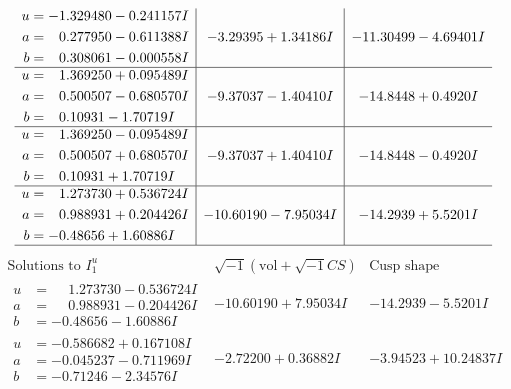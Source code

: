 \documentclass[1p]{elsarticle_modified}
\theoremstyle{definition}
\newcommand{\I}{\sqrt{-1}}
\begin{document}
$$\begin{array}{c|c|c}
\begin{aligned}
u &= -1.329480 - 0.241157 I \\
a &= \phantom{-}0.277950 - 0.611388 I \\
b &= \phantom{-}0.308061 - 0.000558 I\end{aligned}
 & -3.29395 + 1.34186 I & -11.30499 - 4.69401 I \\ \hline\begin{aligned}
u &= \phantom{-}1.369250 + 0.095489 I \\
a &= \phantom{-}0.500507 - 0.680570 I \\
b &= \phantom{-}0.10931 - 1.70719 I\end{aligned}
 & -9.37037 - 1.40410 I & -14.8448 + 0.4920 I \\ \hline\begin{aligned}
u &= \phantom{-}1.369250 - 0.095489 I \\
a &= \phantom{-}0.500507 + 0.680570 I \\
b &= \phantom{-}0.10931 + 1.70719 I\end{aligned}
 & -9.37037 + 1.40410 I & -14.8448 - 0.4920 I \\ \hline\begin{aligned}
u &= \phantom{-}1.273730 + 0.536724 I \\
a &= \phantom{-}0.988931 + 0.204426 I \\
b &= -0.48656 + 1.60886 I\end{aligned}
 & -10.60190 - 7.95034 I & -14.2939 + 5.5201 I\\
 \hline 
 \end{array}$$\newpage$$\begin{array}{c|c|c}  
\text{Solutions to }I^u_{1}& \I (\text{vol} + \sqrt{-1}CS) & \text{Cusp shape}\\
 \hline 
\begin{aligned}
u &= \phantom{-}1.273730 - 0.536724 I \\
a &= \phantom{-}0.988931 - 0.204426 I \\
b &= -0.48656 - 1.60886 I\end{aligned}
 & -10.60190 + 7.95034 I & -14.2939 - 5.5201 I \\ \hline\begin{aligned}
u &= -0.586682 + 0.167108 I \\
a &= -0.045237 - 0.711969 I \\
b &= -0.71246 - 2.34576 I\end{aligned}
 & -2.72200 + 0.36882 I & -3.94523 + 10.24837 I \\ \hline\begin{aligned}

\end{aligned}
\end{array}$$
\end{document}
